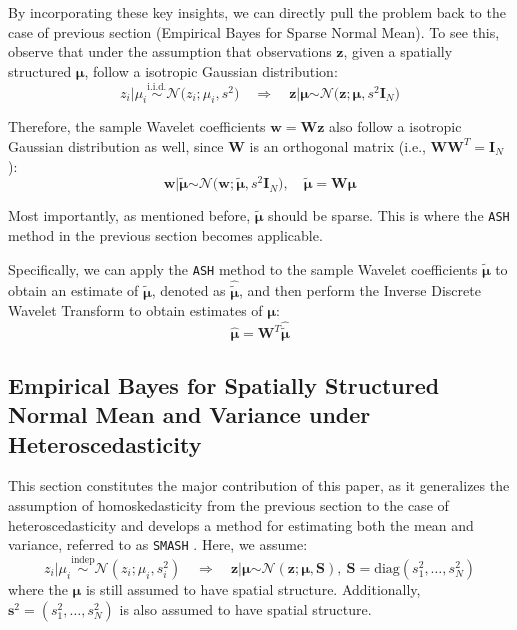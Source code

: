 \documentclass[11pt]{article}
\begin{document}
By incorporating these key insights, 
we can directly pull the problem back to the case of previous section (Empirical Bayes for Sparse Normal Mean). To see this, observe that under the assumption that observations $\boldsymbol{z}$, given a spatially structured $\boldsymbol{\mu}$, follow a isotropic Gaussian distribution:
$$
z_i \vert \mu_i \stackrel{\text{i.i.d.}}{\sim} \mathcal{N} \bigl(z_i; \mu_i, s^2 \bigl) \quad \Longrightarrow \quad \boldsymbol{z} \vert \boldsymbol{\mu} \stackrel{\text{}}{\sim} \mathcal{N} \bigl(\boldsymbol{z}; \boldsymbol{\mu}, s^2 \mathbf{I}_N \bigl)
$$

Therefore, the sample Wavelet coefficients $\boldsymbol{w} = \boldsymbol{Wz}$ also follow a isotropic Gaussian distribution as well, since $\mathbf{W}$ is an orthogonal matrix (i.e., $\mathbf{W}\mathbf{W}^T = \mathbf{I}_N$):
$$
\boldsymbol{w} \vert \tilde{\boldsymbol{\mu}} \stackrel{\text{}}{\sim} \mathcal{N} \bigl(\boldsymbol{w}; \tilde{\boldsymbol{\mu}}, s^2 \mathbf{I}_N \bigl), \quad \tilde{\boldsymbol{\mu}} = \boldsymbol{W\mu}
$$


Most importantly, as mentioned before, $\tilde{\boldsymbol{\mu}}$ should be sparse. This is where the \verb|ASH| method in the previous section becomes applicable.

Specifically, we can apply the \verb|ASH| method to the sample Wavelet coefficients $\tilde{\boldsymbol{\mu}}$ to obtain an estimate of $\tilde{\boldsymbol{\mu}}$, denoted as $\hat{\tilde{\boldsymbol{\mu}}}$, and then perform the Inverse Discrete Wavelet Transform to obtain estimates of $\boldsymbol{\mu}$:
\begin{equation}
\hat{\boldsymbol{\mu}} = \mathbf{W}^{T} \hat{\tilde{\boldsymbol{\mu}}}
\label{inv_DWT}
\end{equation}

\subsection{Empirical Bayes for Spatially Structured Normal Mean and Variance under Heteroscedasticity}
This section constitutes the major contribution of this paper, as it generalizes the assumption of homoskedasticity from the previous section to the case of heteroscedasticity and develops a method for estimating both the mean and variance, referred to as \verb|SMASH| \cite{Xing}. Here, we assume:
\begin{equation}
z_i \vert \mu_i \stackrel{\text{indep}}{\sim} \mathcal{N}(z_i; \mu_i, s_i^2) \quad \Longrightarrow \quad \boldsymbol{z} \vert \boldsymbol{\mu} \stackrel{\text{}}{\sim} \mathcal{N}(\boldsymbol{z}; \boldsymbol{\mu}, \mathbf{S}), \ \mathbf{S} = \text{diag}(s_1^2, \ldots, s_N^2) 
\label{SMASH_assumption1}
\end{equation}
where the $\boldsymbol{\mu}$ is still assumed to have spatial structure. Additionally, $\boldsymbol{s}^2 = (s_1^2, \ldots, s_N^2)$ is also assumed to have spatial structure.
\end{document}
